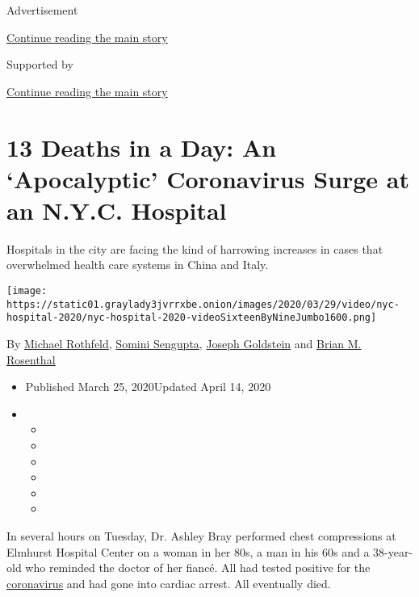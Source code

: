 Advertisement

\protect\hyperlink{after-top}{Continue reading the main story}

Supported by

\protect\hyperlink{after-sponsor}{Continue reading the main story}

\hypertarget{13-deaths-in-a-day-an-apocalyptic-coronavirus-surge-at-an-nyc-hospital}{%
\section{13 Deaths in a Day: An `Apocalyptic' Coronavirus Surge at an
N.Y.C.
Hospital}\label{13-deaths-in-a-day-an-apocalyptic-coronavirus-surge-at-an-nyc-hospital}}

Hospitals in the city are facing the kind of harrowing increases in
cases that overwhelmed health care systems in China and Italy.

\texttt{[image: https://static01.graylady3jvrrxbe.onion/images/2020/03/29/video/nyc-hospital-2020/nyc-hospital-2020-videoSixteenByNineJumbo1600.png]}

By \href{https://www.nytimes3xbfgragh.onion/by/michael-rothfeld}{Michael
Rothfeld},
\href{https://www.nytimes3xbfgragh.onion/by/somini-sengupta}{Somini
Sengupta},
\href{https://www.nytimes3xbfgragh.onion/by/joseph-goldstein}{Joseph
Goldstein} and
\href{https://www.nytimes3xbfgragh.onion/by/brian-m-rosenthal}{Brian M.
Rosenthal}

\begin{itemize}
\item
  Published March 25, 2020Updated April 14, 2020
\item
  \begin{itemize}
  \item
  \item
  \item
  \item
  \item
  \item
  \end{itemize}
\end{itemize}

In several hours on Tuesday, Dr. Ashley Bray performed chest
compressions at Elmhurst Hospital Center on a woman in her 80s, a man in
his 60s and a 38-year-old who reminded the doctor of her fiancé. All had
tested positive for the
\href{https://www.nytimes3xbfgragh.onion/2020/04/14/us/armen-henderson-arrested-homeless-coronavirus-testing.html}{coronavirus}
and had gone into cardiac arrest. All eventually died.

